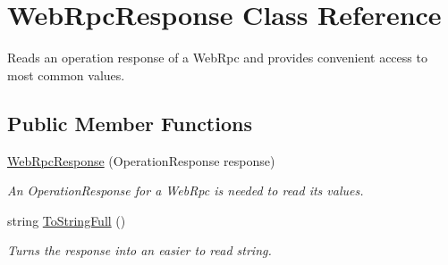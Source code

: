 \hypertarget{class_web_rpc_response}{}\section{Web\+Rpc\+Response Class Reference}
\label{class_web_rpc_response}


Reads an operation response of a Web\+Rpc and provides convenient access to most common values.  


\subsection*{Public Member Functions}
\begin{DoxyCompactItemize}
\item 
\hyperlink{class_web_rpc_response_af5d1ea1f048ed2527f025c8c19d9b133}{Web\+Rpc\+Response} (Operation\+Response response)
\begin{DoxyCompactList}\small\item\em An Operation\+Response for a Web\+Rpc is needed to read it\textquotesingle{}s values.\end{DoxyCompactList}\item 
string \hyperlink{class_web_rpc_response_a26d3e8a8ae6afce9d309b4c8a7f6105e}{To\+String\+Full} ()
\begin{DoxyCompactList}\small\item\em Turns the response into an easier to read string. \end{DoxyCompactList}\end{DoxyCompactItemize}
